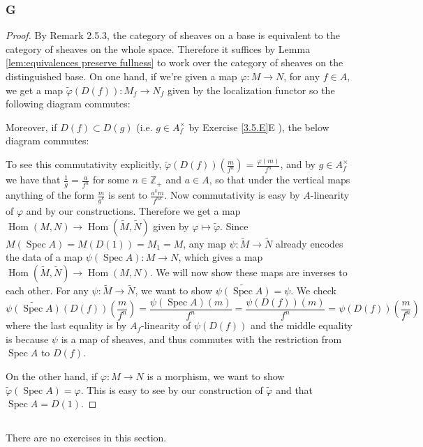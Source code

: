 \documentclass{article}
\newcommand{\Z}{\mathbb{Z}}
\DeclareMathOperator{\Hom}{\mathrm{Hom}}
\DeclareMathOperator{\Spec}{\mathrm{Spec}}
\begin{document}
\subsubsection{G}
\begin{proof}
    By Remark 2.5.3, the category of sheaves on a base is equivalent to the category of sheaves on the whole space. Therefore it suffices by Lemma \ref{lem:equivalences preserve fullness} to work over the category of sheaves on the distinguished base. On one hand, if we're given a map $\varphi:M\to N$, for any $f\in A$, we get a map $\widetilde \varphi (D(f)):M_f \to N_f$ given by the localization functor so the following diagram commutes:
    \begin{center}
    \end{center}
    Moreover, if $D(f)\subset D(g)$ (i.e. $g \in A_f^\times$ by Exercise \ref{3.5.E}E
    ), the below diagram commutes:
    \begin{center}
    \end{center}
    To see this commutativity explicitly, $\widetilde \varphi(D(f))(\frac{m}{f^n})=\frac{\varphi(m)}{f^n}$, and by $g\in A_f^\times$ we have that $\frac{1}{g}=\frac{a}{f^n}$ for some $n\in \Z_+$ and $a\in A$, so that under the vertical maps anything of the form $\frac{m}{g^k}$ is sent to $\frac{a^km}{f^{nk}}$. Now commutativity is easy by $A$-linearity of $\varphi$ and by our constructions. Therefore we get a map $\Hom(M,N)\to \Hom (\widetilde M, \widetilde N)$ given by $\varphi \mapsto \widetilde \varphi$. Since $M(\Spec A)=M(D(1))=M_1=M$, any map $\psi:\widetilde M\to \widetilde N$ already encodes the data of a map $\psi(\Spec A):M\to N$, which gives a map $\Hom(\tilde M, \tilde N) \to \Hom(M,N).$ We will now show these maps are inverses to each other. For any $\psi:\tilde M \to \tilde N$, we want to show $\widetilde{\psi(\Spec A)} = \psi$. We check
    \[
    \widetilde{\psi(\Spec A)}(D(f))(\frac{m}{f^n})=\frac{\psi(\Spec A)(m)}{f^n} = \frac{\psi(D(f))(m)}{f^n} = \psi(D(f))(\frac{m}{f^n})
    \]
    where the last equality is by $A_f$-linearity of $\psi(D(f))$ and the middle equality is because $\psi$ is a map of sheaves, and thus commutes with the restriction from $\Spec A$ to $D(f)$.

    On the other hand, if $\varphi:M\to N$ is a morphism, we want to show $\widetilde{\varphi}(\Spec A) = \varphi$. This is easy to see by our construction of $\widetilde{\varphi}$ and that $\Spec A = D(1)$.
\end{proof}
\subsection{}
There are no exercises in this section.
\printbibliography
\end{document}
